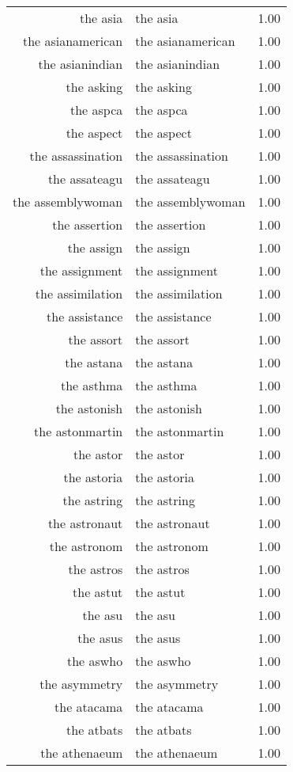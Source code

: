 \begin{table}[ht]
\begin{tabular}{rlr}
  the asia & the asia & 1.00 \\ 
  the asianamerican & the asianamerican & 1.00 \\ 
  the asianindian & the asianindian & 1.00 \\ 
  the asking & the asking & 1.00 \\ 
  the aspca & the aspca & 1.00 \\ 
  the aspect & the aspect & 1.00 \\ 
  the assassination & the assassination & 1.00 \\ 
  the assateagu & the assateagu & 1.00 \\ 
  the assemblywoman & the assemblywoman & 1.00 \\ 
  the assertion & the assertion & 1.00 \\ 
  the assign & the assign & 1.00 \\ 
  the assignment & the assignment & 1.00 \\ 
  the assimilation & the assimilation & 1.00 \\ 
  the assistance & the assistance & 1.00 \\ 
  the assort & the assort & 1.00 \\ 
  the astana & the astana & 1.00 \\ 
  the asthma & the asthma & 1.00 \\ 
  the astonish & the astonish & 1.00 \\ 
  the astonmartin & the astonmartin & 1.00 \\ 
  the astor & the astor & 1.00 \\ 
  the astoria & the astoria & 1.00 \\ 
  the astring & the astring & 1.00 \\ 
  the astronaut & the astronaut & 1.00 \\ 
  the astronom & the astronom & 1.00 \\ 
  the astros & the astros & 1.00 \\ 
  the astut & the astut & 1.00 \\ 
  the asu & the asu & 1.00 \\ 
  the asus & the asus & 1.00 \\ 
  the aswho & the aswho & 1.00 \\ 
  the asymmetry & the asymmetry & 1.00 \\ 
  the atacama & the atacama & 1.00 \\ 
  the atbats & the atbats & 1.00 \\ 
  the athenaeum & the athenaeum & 1.00 \\ 

\end{tabular}
\end{table}
